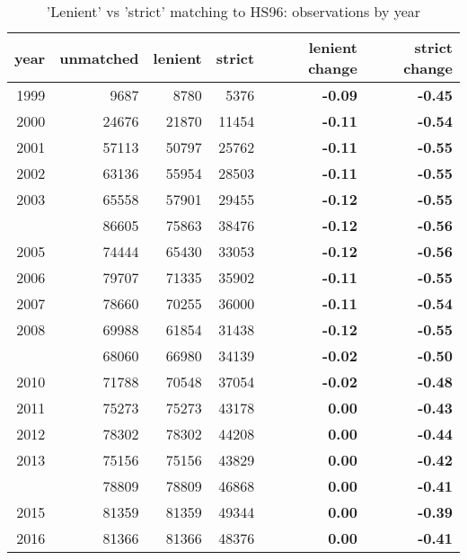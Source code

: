 \begin{table}

\caption{\label{tab:}'Lenient' vs 'strict' matching to HS96: observations by year}
\centering
\begin{tabular}[t]{rrrr>{\bfseries}r>{\bfseries}r}
\toprule
year & unmatched & lenient & strict & lenient change & strict change\\
\midrule
1999 & 9687 & 8780 & 5376 & -0.09 & -0.45\\
2000 & 24676 & 21870 & 11454 & -0.11 & -0.54\\
2001 & 57113 & 50797 & 25762 & -0.11 & -0.55\\
2002 & 63136 & 55954 & 28503 & -0.11 & -0.55\\
2003 & 65558 & 57901 & 29455 & -0.12 & -0.55\\
\addlinespace
2004 & 86605 & 75863 & 38476 & -0.12 & -0.56\\
2005 & 74444 & 65430 & 33053 & -0.12 & -0.56\\
2006 & 79707 & 71335 & 35902 & -0.11 & -0.55\\
2007 & 78660 & 70255 & 36000 & -0.11 & -0.54\\
2008 & 69988 & 61854 & 31438 & -0.12 & -0.55\\
\addlinespace
2009 & 68060 & 66980 & 34139 & -0.02 & -0.50\\
2010 & 71788 & 70548 & 37054 & -0.02 & -0.48\\
2011 & 75273 & 75273 & 43178 & 0.00 & -0.43\\
2012 & 78302 & 78302 & 44208 & 0.00 & -0.44\\
2013 & 75156 & 75156 & 43829 & 0.00 & -0.42\\
\addlinespace
2014 & 78809 & 78809 & 46868 & 0.00 & -0.41\\
2015 & 81359 & 81359 & 49344 & 0.00 & -0.39\\
2016 & 81366 & 81366 & 48376 & 0.00 & -0.41\\
\bottomrule
\end{tabular}
\end{table}
